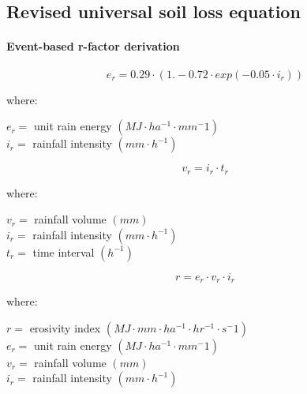 \documentclass[final,3p,times,twocolumn]{elsarticle}
\begin{document}

\subsection{Revised universal soil loss equation} %

\paragraph{Event-based r-factor derivation} %



\cite{Brown1987}
%
\begin{equation}
\label{eq:rain_energy}
{e_r = 0.29 \cdot (1.-0.72 \cdot exp(-0.05 \cdot i_r))}
\end{equation}

\noindent
where: 

\noindent
$e_r =$ unit rain energy $(MJ \cdot ha^{-1} \cdot mm{^-1})$\\
$i_r =$ rainfall intensity $(mm \cdot h^{-1})$\\
\vspace{1em}


\begin{equation}
\label{eq:rain_volume}
{v_r = i_r \cdot t_r} %
\end{equation}

\noindent
where: 

\noindent
$v_r =$ rainfall volume $(mm)$\\
$i_r =$ rainfall intensity $(mm \cdot h^{-1})$\\
$t_r =$ time interval $(h^{-1})$\\
\vspace{1em}


\begin{equation}
\label{eq:erosivity_index}
{r = e_r \cdot v_r \cdot i_r}
\end{equation}

\noindent
where: 

\noindent
$r =$ erosivity index $(MJ \cdot mm \cdot ha^{-1} \cdot hr^{-1} \cdot  s{^-1})$\\
$e_r =$ unit rain energy $(MJ \cdot ha^{-1} \cdot mm{^-1})$\\
$v_r = $ rainfall volume $(mm)$\\
$i_r = $ rainfall intensity $(mm \cdot h^{-1})$\\
\vspace{1em}
\end{document}
